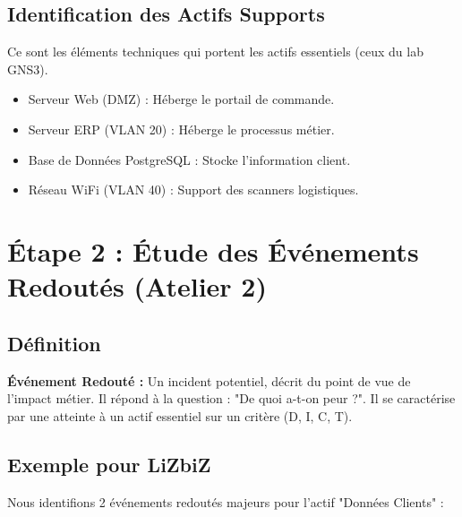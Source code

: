 \subsection{Identification des Actifs Supports}

Ce sont les éléments techniques qui portent les actifs essentiels (ceux du lab GNS3).

\begin{itemize}
    \item Serveur Web (DMZ) : Héberge le portail de commande.
    \item Serveur ERP (VLAN 20) : Héberge le processus métier.
    \item Base de Données PostgreSQL : Stocke l'information client.
    \item Réseau WiFi (VLAN 40) : Support des scanners logistiques.
\end{itemize}

\section{Étape 2 : Étude des Événements Redoutés (Atelier 2)}

\subsection{Définition}

\begin{boxdef}
\textbf{Événement Redouté :} Un incident potentiel, décrit du point de vue de l'impact métier. Il répond à la question : "De quoi a-t-on peur ?". Il se caractérise par une atteinte à un actif essentiel sur un critère (D, I, C, T).
\end{boxdef}

\subsection{Exemple pour LiZbiZ}

Nous identifions 2 événements redoutés majeurs pour l'actif "Données Clients" :

